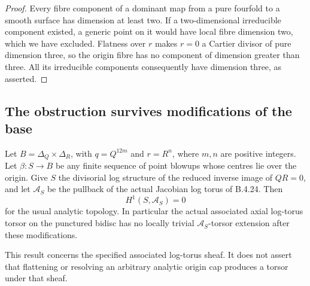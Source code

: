 \begin{proof}
Every fibre component of a dominant map from a
pure fourfold to a smooth surface has dimension
at least two. If a two-dimensional irreducible
component existed, a generic point on it would
have local fibre dimension two, which we have
excluded. Flatness over $r$ makes $r=0$ a
Cartier divisor of pure dimension three, so
the origin fibre has no component of dimension
greater than three. All its irreducible
components consequently have dimension three,
as asserted.
\end{proof}

\subsection{The obstruction survives modifications of the base}

\begin{proposition}\label{push:src:B.4.27}
\label{push:B427}
Let $B=\Delta_Q\times\Delta_R$, with
$q=Q^{12m}$ and $r=R^n$, where $m,n$ are positive
integers. Let $\beta:S\to B$ be any finite sequence
of point blowups whose centres lie over the origin.
Give $S$ the divisorial log structure of the reduced
inverse image of $QR=0$, and let $\mathcal A_S$ be
the pullback of the actual Jacobian log torus of
B.4.24. Then
\[
 H^1(S,\mathcal A_S)=0
 \tag{B.4.27.1}
\]
for the usual analytic topology. In particular the
actual associated axial log-torus torsor on the
punctured bidisc has no locally trivial
$\mathcal A_S$-torsor extension after these
modifications.

This result concerns the specified associated
log-torus sheaf. It does not assert that flattening
or resolving an arbitrary analytic origin cap
produces a torsor under that sheaf.
\end{proposition}

